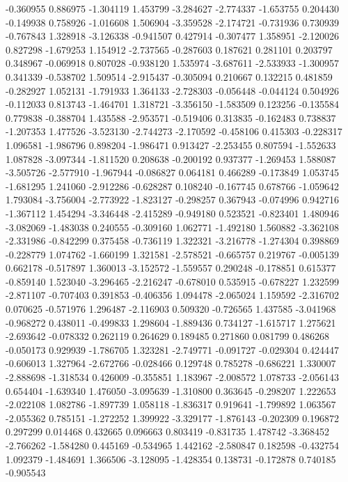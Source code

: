 -0.360955
0.886975
-1.304119
1.453799
-3.284627
-2.774337
-1.653755
0.204430
-0.149938
0.758926
-1.016608
1.506904
-3.359528
-2.174721
-0.731936
0.730939
-0.767843
1.328918
-3.126338
-0.941507
0.427914
-0.307477
1.358951
-2.120026
0.827298
-1.679253
1.154912
-2.737565
-0.287603
0.187621
0.281101
0.203797
0.348967
-0.069918
0.807028
-0.938120
1.535974
-3.687611
-2.533933
-1.300957
0.341339
-0.538702
1.509514
-2.915437
-0.305094
0.210667
0.132215
0.481859
-0.282927
1.052131
-1.791933
1.364133
-2.728303
-0.056448
-0.044124
0.504926
-0.112033
0.813743
-1.464701
1.318721
-3.356150
-1.583509
0.123256
-0.135584
0.779838
-0.388704
1.435588
-2.953571
-0.519406
0.313835
-0.162483
0.738837
-1.207353
1.477526
-3.523130
-2.744273
-2.170592
-0.458106
0.415303
-0.228317
1.096581
-1.986796
0.898204
-1.986471
0.913427
-2.253455
0.807594
-1.552633
1.087828
-3.097344
-1.811520
0.208638
-0.200192
0.937377
-1.269453
1.588087
-3.505726
-2.577910
-1.967944
-0.086827
0.064181
0.466289
-0.173849
1.053745
-1.681295
1.241060
-2.912286
-0.628287
0.108240
-0.167745
0.678766
-1.059642
1.793084
-3.756004
-2.773922
-1.823127
-0.298257
0.367943
-0.074996
0.942716
-1.367112
1.454294
-3.346448
-2.415289
-0.949180
0.523521
-0.823401
1.480946
-3.082069
-1.483038
0.240555
-0.309160
1.062771
-1.492180
1.560882
-3.362108
-2.331986
-0.842299
0.375458
-0.736119
1.322321
-3.216778
-1.274304
0.398869
-0.228779
1.074762
-1.660199
1.321581
-2.578521
-0.665757
0.219767
-0.005139
0.662178
-0.517897
1.360013
-3.152572
-1.559557
0.290248
-0.178851
0.615377
-0.859140
1.523040
-3.296465
-2.216247
-0.678010
0.535915
-0.678227
1.232599
-2.871107
-0.707403
0.391853
-0.406356
1.094478
-2.065024
1.159592
-2.316702
0.070625
-0.571976
1.296487
-2.116903
0.509320
-0.726565
1.437585
-3.041968
-0.968272
0.438011
-0.499833
1.298604
-1.889436
0.734127
-1.615717
1.275621
-2.693642
-0.078332
0.262119
0.264629
0.189485
0.271860
0.081799
0.486268
-0.050173
0.929939
-1.786705
1.323281
-2.749771
-0.091727
-0.029304
0.424447
-0.606013
1.327964
-2.672766
-0.028466
0.129748
0.785278
-0.686221
1.330007
-2.888698
-1.318534
0.426009
-0.355851
1.183967
-2.008572
1.078733
-2.056143
0.654404
-1.639340
1.476050
-3.095639
-1.310800
0.363645
-0.298207
1.222653
-2.022108
1.082786
-1.897739
1.058118
-1.836317
0.919641
-1.799892
1.063567
-2.055362
0.785151
-1.272252
1.399922
-3.329177
-1.876143
-0.202309
0.196872
0.297299
0.014468
0.432665
0.096663
0.803419
-0.831735
1.478742
-3.368452
-2.766262
-1.584280
0.445169
-0.534965
1.442162
-2.580847
0.182598
-0.432754
1.092379
-1.484691
1.366506
-3.128095
-1.428354
0.138731
-0.172878
0.740185
-0.905543
